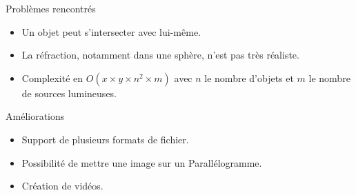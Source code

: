 \documentclass{beamer}
\begin{document}
  \begin{frame}{Problèmes rencontrés}
    \begin{itemize}
      \item Un objet peut s'intersecter avec lui-même.
      \item La réfraction, notamment dans une sphère, n'est pas très réaliste.
      \item Complexité en $O(x\times y\times n^2 \times m)$ avec $n$ le nombre
        d'objets et $m$ le nombre de sources lumineuses.
    \end{itemize}
  \end{frame}

  \begin{frame}{Améliorations}
    \begin{itemize}
      \item Support de plusieurs formats de fichier.
      \item Possibilité de mettre une image sur un Parallélogramme.
      \item Création de vidéos.
    \end{itemize}
  \end{frame}
\end{document}
